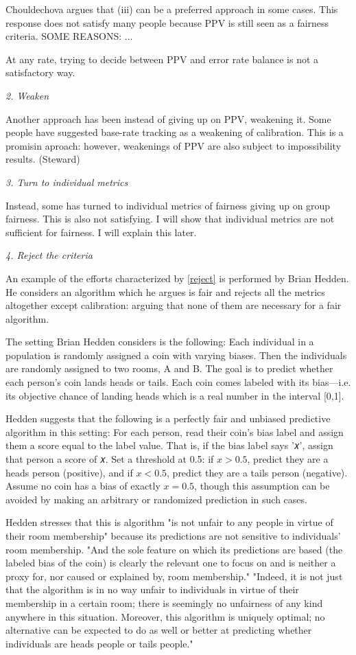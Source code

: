 \documentclass{article}
\begin{document}
Chouldechova \citeyear[p. 161]{Chouldechova_2017} argues that (iii) can be a preferred approach in some cases. This response does not satisfy many people because PPV is still seen as a fairness criteria. SOME REASONS: ... 

At any rate, trying to decide between PPV and error rate balance is not a satisfactory way. 


\textit{2. Weaken}

Another approach has been instead of giving up on PPV, weakening it. Some people have suggested base-rate tracking as a weakening of calibration. This is a promisin aproach: however, weakenings of PPV are also subject to impossibility results. (Steward)

\textit{3. Turn to individual metrics}

Instead, some has turned to individual metrics of fairness giving up on group fairness. This is also not satisfying. I will show that individual metrics are not sufficient for fairness. I will explain this later. 

\textit{4. Reject the criteria}

An example of the efforts characterized by \ref{reject} is performed by Brian Hedden. He considers an algorithm which he argues is fair and rejects all the metrics altogether except calibration: arguing that none of them are necessary for a fair algorithm. 

The setting Brian Hedden considers is the following: Each individual in a population is randomly assigned a coin with  varying biases. Then the individuals are randomly assigned to two rooms, A and B. The goal is to predict whether each person’s coin lands heads or tails. Each coin comes labeled with its bias---i.e. its objective chance of landing heads which is a real number in the interval [0,1]. 

Hedden suggests that the following is a perfectly fair and unbiased predictive algorithm in this setting: For each person, read their coin’s bias label and assign them a score equal to the label value. That is, if the bias label says '𝑥', assign that person a score of 𝑥. Set a threshold at 0.5: if $𝑥>0.5$, predict they are a heads person (positive), and if $x<0.5$, predict they are a tails person (negative). Assume no coin has a bias of exactly $x=0.5$, though this assumption can be avoided by making an arbitrary or randomized prediction in such cases.

Hedden stresses that this is algorithm "is not unfair to any people in virtue of their room membership" because its predictions are not sensitive to individuals’ room membership. "And the sole feature on which its predictions are based (the labeled bias of the coin) is clearly the relevant one to focus on and is neither a proxy for, nor caused or explained by, room membership." "Indeed, it is not just that the algorithm is in no way unfair to individuals in virtue of their membership in a certain room; there is seemingly no unfairness of any kind anywhere in this situation. Moreover, this algorithm is uniquely optimal; no alternative can be expected to do as well or better at predicting whether individuals are heads people or tails people."
\end{document}
